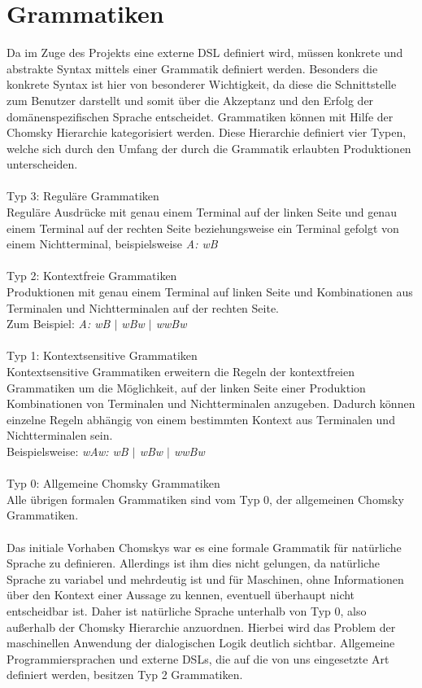 \documentclass[11pt,a4paper,bibtotocnumbered]{scrreprt}
\begin{document}
\section{Grammatiken} 
Da im Zuge des Projekts eine externe DSL definiert wird, müssen konkrete und abstrakte Syntax mittels einer Grammatik definiert werden. Besonders die konkrete Syntax ist hier von besonderer Wichtigkeit, da diese die Schnittstelle zum Benutzer darstellt und somit über die Akzeptanz und den Erfolg der domänenspezifischen Sprache entscheidet.
Grammatiken können mit Hilfe der Chomsky Hierarchie kategorisiert werden. Diese Hierarchie definiert vier Typen, welche sich durch den Umfang der durch die Grammatik erlaubten Produktionen unterscheiden.
\\
\\
Typ 3: Reguläre Grammatiken\\
Reguläre Ausdrücke mit genau einem Terminal auf der linken Seite und genau einem Terminal auf der rechten Seite beziehungsweise ein Terminal gefolgt von einem Nichtterminal, beispielsweise \textit{A: wB}
\\
\\
Typ 2: Kontextfreie Grammatiken\\
Produktionen mit genau einem Terminal auf linken Seite und Kombinationen aus Terminalen und Nichtterminalen auf der rechten Seite. \\Zum Beispiel: \textit{A: wB $\vert$ wBw $\vert$ wwBw}
\\
\\
Typ 1: Kontextsensitive Grammatiken\\
Kontextsensitive Grammatiken erweitern die Regeln der kontextfreien Grammatiken um die Möglichkeit, auf der linken Seite einer Produktion Kombinationen von Terminalen und Nichtterminalen anzugeben. Dadurch können einzelne Regeln abhängig von einem bestimmten Kontext aus Terminalen und Nichtterminalen sein. \\Beispielsweise: \textit{wAw: wB $\vert$ wBw $\vert$ wwBw}
\\
\\
Typ 0: Allgemeine Chomsky Grammatiken\\
Alle übrigen formalen Grammatiken sind vom Typ 0, der allgemeinen Chomsky Grammatiken.
\\
\\
Das initiale Vorhaben Chomskys war es eine formale Grammatik für natürliche Sprache zu definieren. Allerdings ist ihm dies nicht gelungen, da natürliche Sprache zu variabel und mehrdeutig ist und für Maschinen, ohne Informationen über den Kontext einer Aussage zu kennen, eventuell überhaupt nicht entscheidbar ist. Daher ist natürliche Sprache unterhalb von Typ 0, also außerhalb der Chomsky Hierarchie anzuordnen. Hierbei wird das Problem der maschinellen Anwendung der dialogischen Logik deutlich sichtbar. Allgemeine Programmiersprachen und externe DSLs, die auf die von uns eingesetzte Art definiert werden, besitzen Typ 2 Grammatiken.
\end{document}
